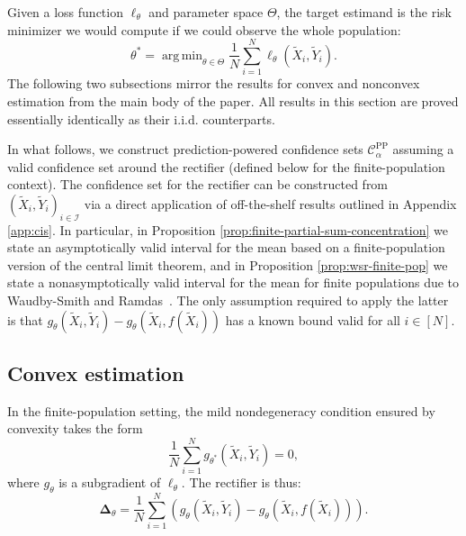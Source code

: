 \documentclass[10pt]{article}
\def\Ical{\mathcal{I}}
\newcommand{\tX}{\widetilde{X}}
\newcommand{\tY}{\widetilde{Y}}
\newcommand{\Xt}{\widetilde{X}}
\newcommand{\Yt}{\widetilde{Y}}
\newcommand{\rec}{\mathbf{\Delta}}
\newcommand{\CPP}{\mathcal{C}^{\mathrm{PP}}}
\DeclareMathOperator*{\argmin}{arg\,min}
\begin{document}
Given a loss function $\ell_\theta$ and parameter space $\Theta$, the target estimand is the risk minimizer we would compute if we could observe the whole population:
\begin{equation}
\label{eq:finite-pop-target}
\theta^* = \argmin_{\theta\in\Theta} \frac 1 N \sum_{i=1}^N \ell_\theta(\Xt_i,\Yt_i).
\end{equation}
The following two subsections mirror the results for convex and nonconvex estimation from the main body of the paper. All results in this section are proved essentially identically as their i.i.d. counterparts.

In what follows, we construct prediction-powered confidence sets $\CPP_\alpha$ assuming a valid confidence set around the rectifier (defined below for the finite-population context). The confidence set for the rectifier can be constructed from $(\Xt_i,\Yt_i)_{i\in\Ical}$ via a direct application of off-the-shelf results outlined in Appendix \ref{app:cis}. In particular, in Proposition \ref{prop:finite-partial-sum-concentration} we state an asymptotically valid interval for the mean based on a finite-population version of the central limit theorem, and in Proposition \ref{prop:wsr-finite-pop} we state a nonasymptotically valid interval for the mean for finite populations due to Waudby-Smith and Ramdas~\cite{waudby2020variance}. The only assumption required to apply the latter is that $g_\theta(\Xt_i,\Yt_i) - g_\theta(\Xt_i,f(\Xt_i))$ has a known bound valid for all $i\in[N]$.






\subsection{Convex estimation}

In the finite-population setting, the mild nondegeneracy condition ensured by convexity takes the form
\begin{equation}
    \label{eq:gradient-zero-finite-pop}
    \frac{1}{N} \sum_{i=1}^N g_{\theta^*}(\tX_i, \tY_i)  = 0,
\end{equation}
where $g_{\theta}$ is a subgradient of $\ell_{\theta}$. The rectifier is thus:
\begin{equation}
\label{eq:convex-rectifier-finite-pop}
    \rec_{\theta} = \frac{1}{N} \sum_{i=1}^N \left(g_\theta(\tX_i, \Yt_i) - g_\theta(\tX_i, f(\Xt_i))\right).
\end{equation}
\end{document}
